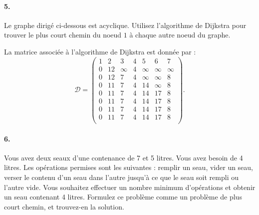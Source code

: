 \paragraph{5. } Le graphe dirigé ci-dessous est acyclique. Utilisez l'algorithme de Dijkstra pour trouver le plus court chemin du noeud $1$ à chaque autre noeud du graphe.

\begin{center}
\end{center}

\begin{solution}
  La matrice associée à l'algorithme de Dijkstra est donnée par :
  \[
    \mathcal{D}=
    \begin{pmatrix}
      1 & 2   & 3       & 4  & 5          & 6 & 7 \\
      \boxed{0} & 12 & \infty & 4 & \infty    &\infty & \infty  \\
      \boxed{0} & 12 & 7       & \boxed{4} & \infty    & \infty  & 8  \\
      \boxed{0} & 11 & \boxed{7}       &\boxed{4} & 14         & \infty  & 8\\
      \boxed{0} & 11 & \boxed{7}       & \boxed{4}& 14         & 17 & \boxed{8}\\
      \boxed{0} & \boxed{11} & \boxed{7}       & \boxed{4} & 14         & 17 &  \boxed{8}\\
      \boxed{0} & \boxed{11} & \boxed{7}      & \boxed{4} & \boxed{14}         & 17 &  \boxed{8}\\
      \boxed{0} & \boxed{11}& \boxed{7}       & \boxed{4} & \boxed{14}         & \boxed{17} &  \boxed{8}\\
    \end{pmatrix}.
  \]
\end{solution}

\paragraph{6. } Vous avez deux seaux d'une contenance de 7 et 5 litres. Vous avez besoin de 4 litres. Les opérations permises sont les suivantes : remplir un seau, vider un seau, verser le contenu d'un seau dans l'autre jusqu'à ce que le seau soit rempli ou l'autre vide. Vous souhaitez effectuer un nombre minimum d'opérations et obtenir un seau contenant 4 litres. Formulez ce problème comme un problème de plus court chemin, et trouvez-en la solution.

